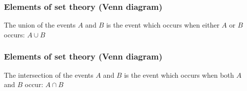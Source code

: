 \documentclass[notes=show,handout]{beamer}\usepackage[]{graphicx}\usepackage[]{color}
\begin{document}
\begin{frame}
\frametitle{Elements of set theory (Venn diagram)}

The union of the events $A$ and $B$ is the event which occurs when either $A$ or $B$ occurs: $A \cup B$ \\
\vspace{1cm}
\hspace{2cm}
\def\firstcircle{(0,0) circle (1.5cm)}
\def\secondcircle{(45:2cm) circle (1.5cm)}

\end{frame}


\begin{frame}
\frametitle{Elements of set theory (Venn diagram)}

The intersection of the events $A$ and $B$ is the event which occurs when both $A$ and $B$ occur: $A \cap B$\\
\vspace{1cm}
\hspace{2cm}
\def\firstcircle{(0,0) circle (1.5cm)}
\def\secondcircle{(45:2cm) circle (1.5cm)}

\end{frame}


%
%
\end{document}
